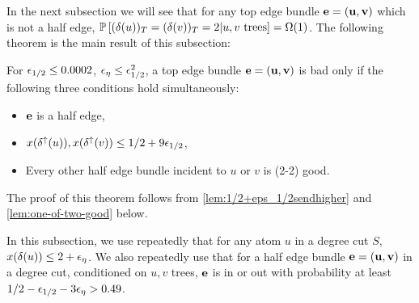 In the next subsection we will see that for any top edge bundle $\bbe={\bf (u,v)}$ which is not a half edge, $\P{(\delta(u))_T=(\delta(v))_T=2 | u,v\text{ trees}} = \Omega(1)$. 
The following theorem is the main result of this subsection:
\begin{theorem}\label{thm:badedges}
For $\eps_{1/2}\leq 0.0002$, $\eps_{\eta}\leq \eps_{1/2}^2$, a top edge bundle $\bbe={\bf (u,v)}$ is bad only if the following three conditions hold simultaneously: 
\begin{itemize}
\item $\bbe$ is a half edge, 
\item $x(\delta^\uparrow(u)),x(\delta^\uparrow(v))\leq 1/2+9\eps_{1/2}$,
\item Every other half edge bundle incident to $u$ or $v$ is (2-2) good.
\end{itemize}
\end{theorem}
The proof of this theorem follows from \cref{lem:1/2+eps_1/2sendhigher} and \cref{lem:one-of-two-good} below. 


In this subsection, we use repeatedly that for any atom $u$ in a degree cut $S$, $x(\delta(u))\leq 2+\eps_{\eta}$. We also repeatedly use that for a half edge bundle $\bbe={\bf (u,v)}$ in a degree cut, conditioned on $u,v$ trees, $\bbe$ is in or out with probability at least $1/2-\eps_{1/2}-3\eps_\eta>0.49$.

